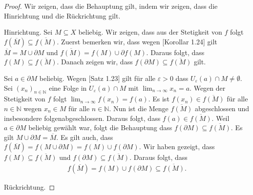 \documentclass[draft,a5paper]{article}
\theoremstyle{remark}
\begin{document}
\begin{proof}
  Wir zeigen, dass die Behauptung gilt, indem wir zeigen, dass die
  Hinrichtung und die Rückrichtung gilt.

  Hinrichtung.  Sei \(M \subseteq X\) beliebig.  Wir zeigen, dass aus der
  Stetigkeit von \(f\) folgt
  \(f(\overline{M}) \subseteq \overline{f(M)}\).  Zuerst bemerken wir, dass
  wegen [Korollar 1.24] gilt \(\overline{M} = M \cup \partial M\) und
  \(\overline{f(M)} = f(M) \cup \partial f(M)\).  Daraus folgt, dass
  \(f(M) \subseteq \overline{f(M)}\).  Danach zeigen wir, dass
  \(f(\partial M) \subseteq \overline{f(M)}\) gilt.

  Sei \(a \in \partial M\) beliebig.  Wegen [Satz 1.23] gilt für alle
  \(\varepsilon > 0\) dass
  \(U_{\varepsilon}(a) \cap M \ne \emptyset\).  Sei
  \((x_{n})_{n \in \mathbb{N}}\) eine Folge in
  \(U_{\varepsilon}(a) \cap M\) mit
  \(\lim_{n \to \infty}{x_{n}} = a\).  Wegen der Stetigkeit von \(f\) folgt
  \(\lim_{n \to \infty}{f(x_{n})} = f(a)\).  Es ist
  \(f(x_{n}) \in \overline{f(M)}\) für alle \(n \in \mathbb{N}\) wegen
  \(x_{n} \in M\) für alle \(n \in \mathbb{N}\). Nun ist die Menge
  \(\overline{f(M)}\) abgeschlossen und insbesondere
  folgenabgeschlossen.  Daraus folgt, dass
  \(f(a) \in \overline{f(M)}\).  Weil \(a \in \partial M\) beliebig gewählt war,
  folgt die Behauptung dass
  \(f(\partial M) \subseteq \overline{f(M)}\). Es gilt
  \(M \cup \partial M = \overline{M}\).  Es gilt auch, dass
  \(f(\overline{M}) = f(M \cup \partial M) = f(M) \cup f(\partial M)\).  Wir haben
  gezeigt, dass \(f(M) \subseteq \overline{f(M)}\) und
  \(f(\partial M) \subseteq \overline{f(M)}\).  Daraus folgt, dass
  \begin{align*}
    f(\overline{M}) = f(M) \cup f(\partial M) \subseteq \overline{f(M)}.
  \end{align*}

  Rückrichtung.
\end{proof}
\end{document}
